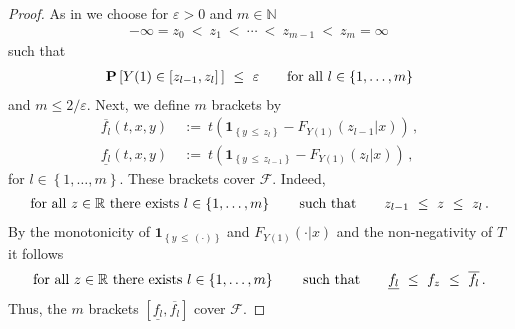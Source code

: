 \begin{proof}
  As in \cite[Example~19.6]{Vaart2000}
  we choose for
  $\varepsilon>0$ and $m\in\mathbb{N}$
  \begin{gather*}
  -\infty=z_0\ <\ z_1\ <\ \cdots\ <\ z_{m-1}\ <\ z_m=\infty
  \,
  \end{gather*}
  such that
  \begin{gather}
    \label{size_z}
    \P
    \left[ 
      Y(1)\in \left[ z_{l-1},z_l \right]\,
    \right]
    \ 
    \le
    \ 
    \varepsilon
    \qquad
    \text{for all}\ 
    l\in \left\{ 1,\ldots,m \right\}
  \end{gather}
  and $m \le 2/\varepsilon$.
  Next, we define $m$ brackets by
\begin{align*}
  \overline{f_l}
  (t,x,y)
  &
  \ 
  :=
  \ 
      t
      \left( 
        \mathbf{1}
        _{\left\{  y\,\le\,z_{l} \right\}}
        -
        F_{Y(1)}(z_{l-1}|x)
      \right)
      \,,
      \\
  \underline{f_l}
  (t,x,y)
  &
  \ 
  :=
  \ 
      t
      \left( 
        \mathbf{1}
        _{\left\{  y\,\le\,z_{l-1} \right\}}
        -
        F_{Y(1)}(z_l|x)
      \right)
      \,,
\end{align*}
for $l\in \left\{ 1,\ldots,m \right\}$.
These brackets cover $\mathcal{F}$.
Indeed,
\begin{gather*}
  \text{for all}\ 
  z\in\R
  \ 
  \text{there exists} \ 
l\in \left\{ 1,\ldots,m \right\}
\qquad 
\text{such that}\qquad
z_{l-1}
\ 
\le
\ 
z
\ 
\le
\ 
z_l
\,.
\end{gather*}
By the monotonicity of 
$
        \mathbf{1}
      _{\left\{  y\,\le\,(\cdot) \right\}}
$
and
$
        F_{Y(1)}(\cdot|x)
$
and the non-negativity of $T$ it follows
\begin{gather*}
  \text{for all}\ 
  z\in\R
  \ 
  \text{there exists} \ 
l\in \left\{ 1,\ldots,m \right\}
\qquad 
\text{such that}\qquad
  \underline{f_l}
  \ 
  \le
  \ 
  f_z
  \ 
  \le
  \ 
  \overline{f_l}
  \,.
\end{gather*}
Thus, the $m$ brackets 
$
[
  \underline{f_l}
  ,
  \overline{f_l}
]
$
cover $\mathcal{F}$.


\end{proof}
